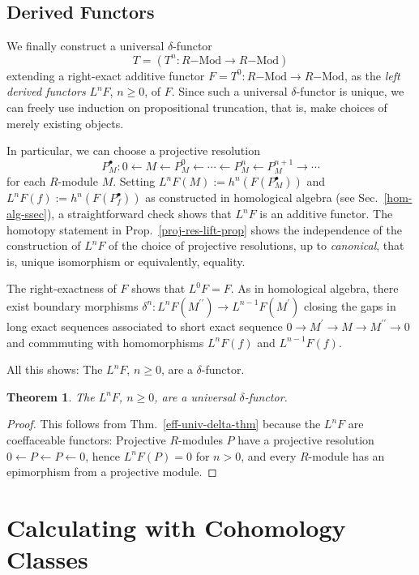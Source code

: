 \documentclass{amsart}
\theoremstyle{plain}
\newtheorem{thm}{Theorem}[section]
\numberwithin{equation}{section} %
\numberwithin{figure}{section} %
\theoremstyle{plain}
\theoremstyle{plain}
\theoremstyle{plain}
\theoremstyle{plain}
\theoremstyle{plain}
\theoremstyle{plain}
\theoremstyle{remark}
\theoremstyle{remark}
\theoremstyle{remark}
\begin{document}
\subsection{Derived Functors} \label{der-funct-ssec}

We finally construct a universal $\delta$-functor 
\[ T = (T^n: R\mathrm{-Mod} \rightarrow R\mathrm{-Mod}) \] 
extending a right-exact additive functor $F = T^0: R\mathrm{-Mod} \rightarrow R\mathrm{-Mod}$, as the \textit{left derived functors} $L^n F$, $n \geq 0$, of $F$. Since such a universal $\delta$-functor is unique, we can freely use induction on propositional truncation, that is, make choices of merely existing objects.

In particular, we can choose a projective resolution
\[ P^\bullet_M: 0 \leftarrow M \leftarrow P^0_M \leftarrow \cdots \leftarrow P^n_M \leftarrow P^{n+1}_M \rightarrow \cdots  \]
for each $R$-module $M$. Setting $L^n F(M) := h^n(F(P^\bullet_M))$ and $L^n F(f) := h^n(F(P^\bullet_f))$ as constructed in homological algebra (see Sec.~\ref{hom-alg-ssec}), a straightforward check shows that $L^n F$ is an additive functor. The homotopy statement in Prop.~\ref{proj-res-lift-prop} shows the independence of the construction of $L^n F$ of the choice of projective resolutions, up to \textit{canonical}, that is, unique isomorphism or equivalently, equality.

The right-exactness of $F$ shows that $L^0 F = F$. As in homological algebra, there exist boundary morphisms $\delta^n: L^n F(M^{\prime\prime}) \rightarrow L^{n-1} F(M^\prime)$ closing the gaps in long exact sequences associated to short exact sequence $0 \rightarrow M^\prime \rightarrow M \rightarrow M^{\prime\prime} \rightarrow 0$ and commmuting with homomorphisms $L^n F(f)$ and $L^{n-1} F(f)$. 

All this shows: The $L^n F$, $n \geq 0$, are a $\delta$-functor.
\begin{thm}
The $L^n F$, $n \geq 0$, are a universal $\delta$-functor.
\end{thm}
\begin{proof}
This follows from Thm.~\ref{eff-univ-delta-thm} because the $L^n F$ are coeffaceable functors: Projective $R$-modules $P$ have a projective resolution $0 \leftarrow P \leftarrow P \leftarrow 0$, hence $L^n F(P) = 0$ for $n > 0$, and every $R$-module has an epimorphism from a projective module.
\end{proof}


\section{Calculating with Cohomology Classes} \label{calc-cohom-sec}
 
\end{document}
